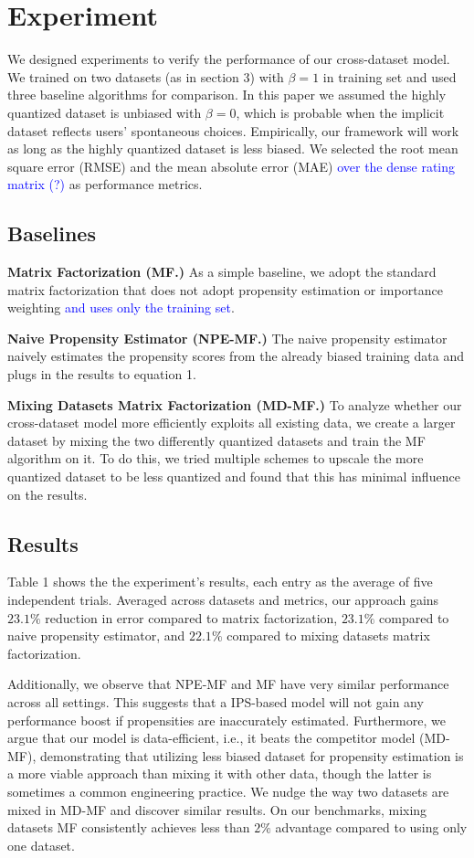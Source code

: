 \documentclass{article}
\begin{document}
\section{Experiment}
We designed experiments to verify the performance of our cross-dataset model. We trained on two datasets (as in section 3) with $\beta =1$ in training set and used three baseline algorithms for comparison. In this paper we assumed the highly quantized dataset is unbiased with $\beta=0$, which is probable when the implicit dataset reflects users' spontaneous choices. Empirically, our framework will work as long as the highly quantized dataset is less biased. We selected the root mean square error (RMSE) and the mean absolute error (MAE) \textcolor{blue}{over the dense rating matrix (?)} as performance metrics. 

\subsection{Baselines}
\textbf{Matrix Factorization (MF.)}
As a simple baseline, we adopt the standard matrix factorization that does not adopt propensity estimation or importance weighting \textcolor{blue}{and uses only the training set}.

\textbf{Naive Propensity Estimator (NPE-MF.)}
The naive propensity estimator naively estimates the propensity scores from the already biased training data and plugs in the results to equation 1.

\textbf{Mixing Datasets Matrix Factorization (MD-MF.)}
To analyze whether our cross-dataset model more efficiently exploits all existing data, we create a larger dataset by mixing the two differently quantized datasets and train the MF algorithm on it. To do this, we tried multiple schemes to upscale the more quantized dataset to be less quantized and found that this has minimal influence on the results.

\subsection{Results}
Table 1 shows the the experiment's results, each entry as the average of five independent trials. Averaged across datasets and metrics, our approach gains $23.1\%$ reduction in error compared to matrix factorization, $23.1\%$ compared to naive propensity estimator, and $22.1\%$ compared to mixing datasets matrix factorization. 

Additionally, we observe that NPE-MF and MF have very similar performance across all settings. This suggests that a IPS-based model will not gain any performance boost if propensities are inaccurately estimated. Furthermore, we argue that our model is data-efficient, i.e., it beats the competitor model (MD-MF), demonstrating that utilizing less biased dataset for propensity estimation is a more viable approach than mixing it with other data, though the latter is sometimes a common engineering practice. We nudge the way two datasets are mixed in MD-MF and discover similar results. On our benchmarks, mixing datasets MF consistently achieves less than $2\%$ advantage compared to using only one dataset.
\end{document}
